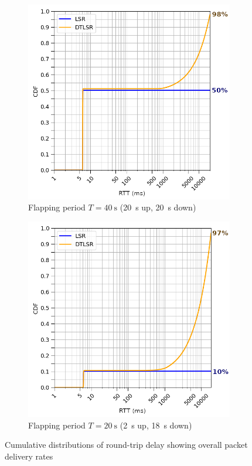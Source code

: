\documentclass[withindex,glossary,openany]{cam-thesis}
\begin{document}
\begin{figure}[h]
\centering
\begin{subfigure}{.5\textwidth}
  \includegraphics[width=1\linewidth]{delay_partition_flap20}
  \caption{Flapping period $T=\SI{40}{\s}$ (\SI{20}{\s} up, \SI{20}{\s} down)}
  \label{fig:partition_20}
\end{subfigure}%
\begin{subfigure}{.5\textwidth}
  \includegraphics[width=1\linewidth]{delay_partition_flap2_18}
  \caption{Flapping period $T=\SI{20}{\s}$ (\SI{2}{\s} up, \SI{18}{\s} down)}
  \label{fig:partition_2_18}
\end{subfigure}
\caption{Cumulative distributions of round-trip delay showing overall packet delivery rates}
\label{fig:partition}
\end{figure}
\end{document}
